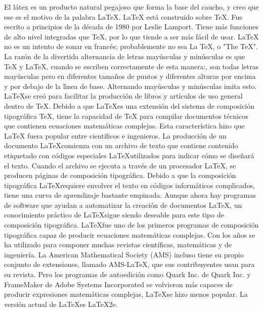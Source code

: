 \documentclass[letterpaper, 10pt, journal]{IEEEtran}
\begin{document}
El l\'{a}tex es un producto natural pegajoso que forma la base del caucho, y creo que ese es el motivo de la palabra LaTeX. LaTeX est\'{a} construido sobre TeX. Fue escrito a principios de la d\'{e}cada de 1980 por Leslie Lamport. Tiene m\'{a}s funciones de alto nivel integradas que TeX, por lo que tiende a ser m\'{a}s f\'{a}cil de usar. LaTeX no es un intento de sonar en franc\'{e}s; probablemente no sea La TeX, o "The TeX". La raz\'{o}n de la divertida alternancia de letras may\'{u}sculas y min\'{u}sculas es que TeX y LaTeX, cuando se escriben correctamente de esta manera:, son todas letras may\'{u}sculas pero en diferentes tama\~{n}os de puntos y diferentes alturas por encima y por debajo de la l\'{\i}nea de base. Alternando may\'{u}sculas y min\'{u}sculas imita esto. \cite{[3]}
\newline
\LaTeX   se cre\'o para facilitar la producci\'on de libros y art\'iculos de uso general dentro de TeX. Debido a que \LaTeX   es una extensi\'on del sistema de composici\'on tipogr\'afica TeX, tiene la capacidad de TeX para compilar documentos t\'ecnicos que contienen ecuaciones matem\'aticas complejas. Esta caracter\'istica hizo que LaTeX fuera popular entre cient\'ificos e ingenieros. \cite{[1]}
\newline
La producci\'on de un documento \LaTeX   comienza con un archivo de texto que contiene contenido etiquetado con c\'odigos especiales \LaTeX   utilizados para indicar c\'omo se dise\~nar\'a el texto. Cuando el archivo se ejecuta a trav\'es de un procesador \LaTeX  , se producen p\'aginas de composici\'on tipogr\'afica. Debido a que la composici\'on tipogr\'afica \LaTeX   requiere envolver el texto en c\'odigos inform\'aticos complicados, tiene una curva de aprendizaje bastante empinada. Aunque ahora hay programas de software que ayudan a automatizar la creaci\'on de documentos \LaTeX  , un conocimiento pr\'actico de \LaTeX   sigue siendo deseable para este tipo de composici\'on tipogr\'afica.
\newline
\LaTeX   fue uno de los primeros programas de composici\'on tipogr\'afica capaz de producir ecuaciones matem\'aticas complejas. Con los a\~nos se ha utilizado para componer muchas revistas cient\'ificas, matem\'aticas y de ingenier\'ia. La American Mathematical Society (AMS) incluso tiene su propio conjunto de extensiones, llamado AMS-LaTeX, que sus contribuyentes usan para su revista. Pero los programas de autoedici\'on como Quark Inc. de Quark Inc. y FrameMaker de Adobe Systems Incorporated se volvieron m\'as capaces de producir expresiones matem\'aticas complejas, \LaTeX   se hizo menos popular.\cite{[1]}
La versi\'on actual de \LaTeX   es \LaTeX 2e. \cite{[2]}
\end{document}
